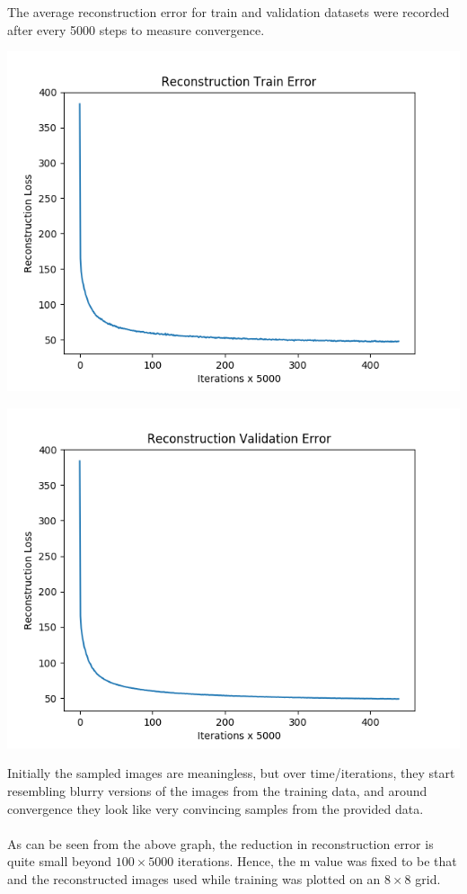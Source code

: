 \documentclass[12pt]{report}
\begin{document}
The average reconstruction error for train and validation datasets were recorded after every 5000 steps to measure convergence.
\begin{center}
\includegraphics[scale=0.5]{cost_train_lr_0_001_k_1_n_256.png}
\end{center}
\begin{center}
\includegraphics[scale=0.5]{cost_val_lr_0_001_k_1_n_256.png}
\end{center}

Initially the sampled images are meaningless, but over time/iterations, they start resembling blurry versions of the images from the training data, and around convergence they look like very convincing samples from the provided data.\\\\
As can be seen from the above graph, the reduction in reconstruction error is quite small beyond $100 \times 5000$ iterations. Hence, the m value was fixed to be that and the reconstructed images used while training was plotted on an $8 \times 8$ grid.
\end{document}
